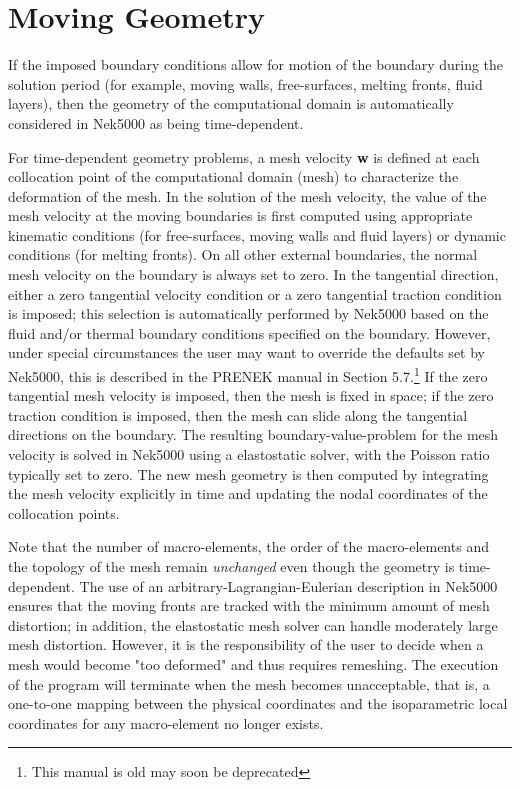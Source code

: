 \section{Moving Geometry}
If the imposed boundary conditions allow for motion
of the boundary during the solution period (for example,
moving walls, free-surfaces, melting fronts, fluid layers),
then the geometry of the computational domain is automatically
considered in Nek5000 as being time-dependent.

For time-dependent geometry problems,
a mesh velocity {\bf w} is defined at each
collocation point of the computational domain (mesh) to
characterize the deformation of the mesh.
In the solution of the mesh velocity, the value of the mesh
velocity at the moving boundaries is first computed
using appropriate kinematic conditions (for free-surfaces, moving walls
and fluid layers) or dynamic conditions (for melting fronts).
On all other external boundaries, the normal mesh velocity on the
boundary is always set to zero.
In the tangential direction, either a zero tangential velocity
condition or a zero tangential traction condition is imposed; this
selection is automatically performed by Nek5000 based on
the fluid and/or thermal boundary conditions specified
on the boundary.
However, under special circumstances the user may want
to override the defaults set by Nek5000, this is
described in the PRENEK manual in Section 5.7.\footnote{This manual is old may soon be deprecated}
If the zero tangential mesh velocity is imposed, then the mesh
is fixed in space; if the zero traction condition is imposed,
then the mesh can slide along the tangential directions on
the boundary.
The resulting boundary-value-problem for the mesh velocity is solved
in Nek5000 using a elastostatic solver, with the Poisson ratio
typically set to zero.
The new mesh geometry is then computed by integrating the
mesh velocity explicitly in time and updating the nodal coordinates of the
collocation points.

Note that the number of macro-elements, the order of the macro-elements
and the topology of the mesh remain {\em unchanged} even though
the geometry is time-dependent.
The use of an arbitrary-Lagrangian-Eulerian description in Nek5000
ensures that the moving fronts are tracked with the minimum amount
of mesh distortion;
in addition, the elastostatic mesh solver can handle moderately
large mesh distortion.
However, it is the responsibility of the user to decide when
a mesh would become "too deformed" and thus requires remeshing.
The execution of the program will terminate when the mesh becomes
unacceptable, that is, a one-to-one mapping between the physical
coordinates and the isoparametric local coordinates for any
macro-element no longer exists.